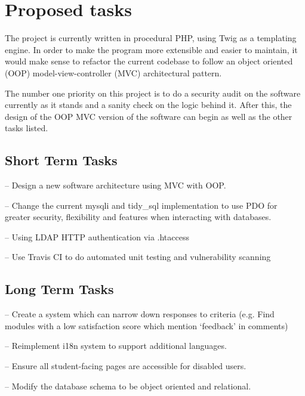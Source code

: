 \documentclass[11pt,fleqn,twoside]{article}
\begin{document}
\section{Proposed tasks}

The project is currently written in procedural PHP, using Twig\cite{Twig} as a templating engine.
In order to make the program more extensible and easier to maintain, it would make sense to refactor the current codebase to follow an object oriented (OOP) model-view-controller (MVC)\cite{PHPMVC} architectural pattern.

The number one priority on this project is to do a security audit on the software currently as it stands and a sanity check on the logic behind it.
After this, the design of the OOP MVC version of the software can begin as well as the other tasks listed.

\subsection{Short Term Tasks}
\begin{description}[itemsep=-0.25em,itemindent=-2em,leftmargin=4em]
	\item[Change procedural design] -- Design a new software architecture using MVC with OOP.
	\item[PHP Data Objects (PDO)] -- Change the current mysqli and tidy\_sql implementation to use PDO for greater security, flexibility and features when interacting with databases.
	\item[Protect admin dashboard] -- Using LDAP HTTP authentication via .htaccess
	\item[Unit Testing] -- Use Travis CI\cite{TravisCI} to do automated unit testing and vulnerability scanning
\end{description}

\subsection{Long Term Tasks}
\begin{description}[itemsep=-0.25em,itemindent=-2em,leftmargin=4em]
	\item[Analytics/Reports] -- Create a system which can narrow down responses to criteria (e.g. Find modules with a low satisfaction score which mention `feedback' in comments)
	\item[Internationalisation (i18n)] -- Reimplement i18n system to support additional languages.
	\item[Accessibility (a11y)] -- Ensure all student-facing pages are accessible for disabled users.
	\item[Relational Database] -- Modify the database schema to be object oriented and relational.
\end{description}
\end{document}
